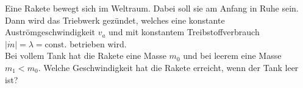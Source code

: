 \begin{Exercise}[label = rocket1, title = Rakete im Weltraum, difficulty = 4, origin = Aaron Wild]
	Eine Rakete bewegt sich im Weltraum. Dabei soll sie am Anfang in Ruhe sein. Dann wird das Triebwerk gezündet, welches eine konstante Auströmgeschwindigkeit $v_a$ und mit konstantem Treibstoffverbrauch $|\dot{m}| = \lambda =\mathrm{const.}$ betrieben wird. \\
	Bei vollem Tank hat die Rakete eine Masse $m_0$ und bei leerem eine Masse $m_1<m_0$. Welche Geschwindigkeit hat die Rakete erreicht, wenn der Tank leer ist?
\end{Exercise} 